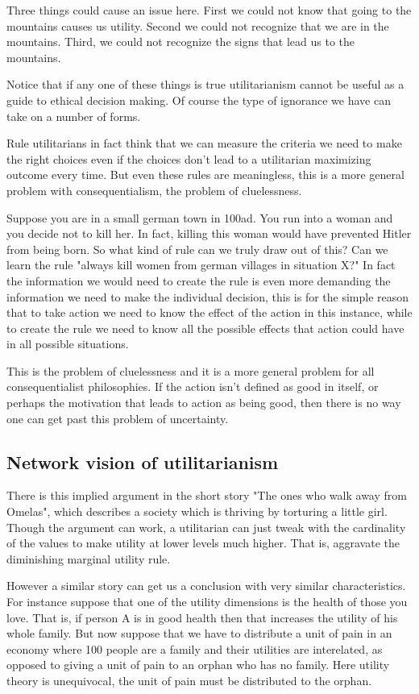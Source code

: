 \documentclass[12pt]{report}
\numberwithin{equation}{section}
\begin{document}
Three things could cause an issue here. First we could not know that going to the mountains causes us utility. Second we could not recognize that we are in the mountains. Third, we could not recognize the signs that lead us to the mountains. 

Notice that if any one of these things is true utilitarianism cannot be useful as a guide to ethical decision making. Of course the type of ignorance we have can take on a number of forms. 

Rule utilitarians in fact think that we can measure the criteria we need to make the right choices even if the choices don't lead to a utilitarian maximizing outcome every time. But even these rules are meaningless, this is a more general problem with consequentialism, the problem of cluelessness.

Suppose you are in a small german town in 100ad. You run into a woman and you decide not to kill her. In fact, killing this woman would have prevented Hitler from being born. So what kind of rule can we truly draw out of this? Can we learn the rule "always kill women from german villages in situation X?" In fact the information we would need to create the rule is even more demanding the information we need to make the individual decision, this is for the simple reason that to take action we need to know the effect of the action in this instance, while to create the rule we need to know all the possible effects that action could have in all possible situations. 

This is the problem of cluelessness\cite{Lenman2000} and it is a more general problem for all consequentialist philosophies. If the action isn't defined as good in itself, or perhaps the motivation that leads to action as being good, then there is no way one can get past this problem of uncertainty. 


\subsection{Network vision of utilitarianism}

There is this implied argument in the short story "The ones who walk away from Omelas", which describes a society which is thriving by torturing a little girl. Though the argument can work, a utilitarian can just tweak with the cardinality of the values to make utility at lower levels much higher. That is, aggravate the diminishing marginal utility rule. 

However a similar story can get us a conclusion with very similar characteristics. For instance suppose that one of the utility dimensions is the health of those you love. That is, if person A is in good health then that increases the utility of his whole family. But now suppose that we have to distribute a unit of pain in an economy where 100 people are a family and their utilities are interelated, as opposed to giving a unit of pain to an orphan who has no family. Here utility theory is unequivocal, the unit of pain must be distributed to the orphan. 
\end{document}
